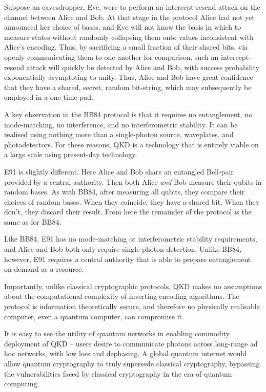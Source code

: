 \documentclass[aps,rmp,twocolumn,amsmath,amssymb,nofootinbib,superscriptaddress,longbibliography,floatfix]{revtex4-1}
\begin{document}
Suppose an eavesdropper, Eve, were to perform an intercept-resend attack on the channel between Alice and Bob. At that stage in the protocol Alice had not yet announced her choice of bases, and Eve will not know the basis in which to measure states without randomly collapsing them onto values inconsistent with Alice's encoding. Thus, by sacrificing a small fraction of their shared bits, via openly communicating them to one another for comparison, such an intercept-resend attack will quickly be detected by Alice and Bob, with success probability exponentially asymptoting to unity. Thus, Alice and Bob have great confidence that they have a shared, secret, random bit-string, which may subsequently be employed in a one-time-pad.

A key observation in the BB84 protocol is that it requires no entanglement, no mode-matching, no interference, and no interferometric stability. It can be realised using nothing more than a single-photon source, waveplates, and photodetectors. For these reasons, QKD is a technology that is entirely viable on a large scale using present-day technology.

E91 is slightly different. Here Alice and Bob share an entangled Bell-pair provided by a central authority. Then both Alice \emph{and} Bob measure their qubits in random bases. As with BB84, after measuring all qubits, they compare their choices of random bases. When they coincide, they have a shared bit. When they don't, they discard their result. From here the remainder of the protocol is the same as for BB84.

Like BB84, E91 has no mode-matching or interferometric stability requirements, and Alice and Bob both only require single-photon detection. Unlike BB84, however, E91 requires a central authority that is able to prepare entanglement on-demand as a resource.

Importantly, unlike classical cryptographic protocols, QKD makes no assumptions about the computational complexity of inverting encoding algorithms. The protocol is information theoretically secure, and therefore no physically realisable computer, even a quantum computer, can compromise it.

It is easy to see the utility of quantum networks in enabling commodity deployment of QKD -- users desire to communicate photons across long-range ad hoc networks, with low loss and dephasing. A global quantum internet would allow quantum cryptography to truly supersede classical cryptography, bypassing the vulnerabilities faced by classical cryptography in the era of quantum computing.
\end{document}
